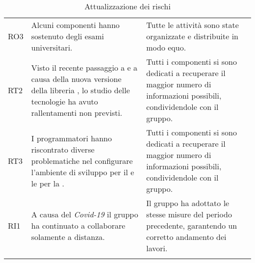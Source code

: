 \begin{longtable}{C{1cm} | C{8cm} | C{7cm}}
 	RO3 & Alcuni componenti hanno sostenuto degli esami universitari. &  Tutte le attività sono state organizzate e distribuite in modo equo.  \\	 	
 	
 	RT2 & Visto il recente passaggio a  e a causa della nuova versione della libreria , lo studio delle tecnologie ha avuto rallentamenti non previsti. &  Tutti i componenti si sono dedicati a recuperare il maggior numero di informazioni possibili, condividendole con il gruppo.  \\	 
 	
 	RT3 & I programmatori hanno riscontrato diverse problematiche nel configurare l'ambiente di sviluppo per il  e le  per la . &  Tutti i componenti si sono dedicati a recuperare il maggior numero di informazioni possibili, condividendole con il gruppo.  \\
 	 	
	RI1 & A causa del \textit{Covid-19} il gruppo ha continuato a collaborare solamente a distanza. & Il gruppo ha adottato le stesse misure del periodo precedente, garantendo un corretto andamento dei lavori. \\
 	
 	\caption{Attualizzazione dei rischi}
 	
\end{longtable}